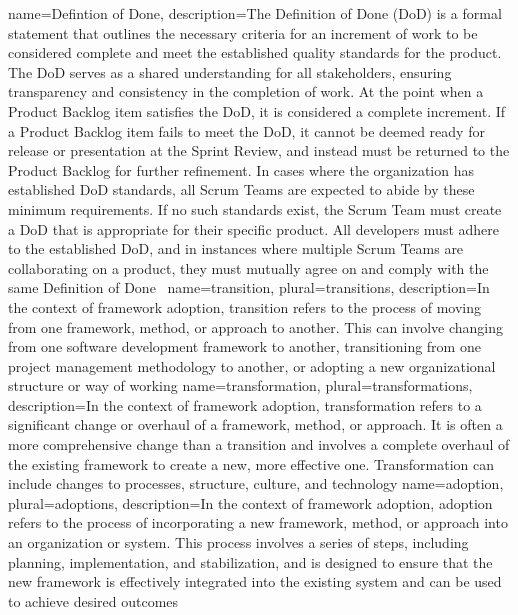 {
    name={Defintion of Done},
    description={The Definition of Done (DoD) is a formal statement that outlines the necessary criteria for an increment of work to be considered complete and meet the established quality standards for the product. The DoD serves as a shared understanding for all stakeholders, ensuring transparency and consistency in the completion of work.
        At the point when a Product Backlog item satisfies the DoD, it is considered a complete increment. If a Product Backlog item fails to meet the DoD, it cannot be deemed ready for release or presentation at the Sprint Review, and instead must be returned to the Product Backlog for further refinement.
        In cases where the organization has established DoD standards, all Scrum Teams are expected to abide by these minimum requirements. If no such standards exist, the Scrum Team must create a DoD that is appropriate for their specific product.
        All developers must adhere to the established DoD, and in instances where multiple Scrum Teams are collaborating on a product, they must mutually agree on and comply with the same Definition of Done~\cite{Huether2017TDo}}
}
{
    name={transition},
    plural={transitions},
    description={In the context of framework adoption, transition refers to the process of moving from one framework, method, or approach to another. This can involve changing from one software development framework to another, transitioning from one project management methodology to another, or adopting a new organizational structure or way of working}
}
{
    name={transformation},
    plural={transformations},
    description={In the context of framework adoption, transformation refers to a significant change or overhaul of a framework, method, or approach. It is often a more comprehensive change than a transition and involves a complete overhaul of the existing framework to create a new, more effective one. Transformation can include changes to processes, structure, culture, and technology}
}
{
    name={adoption},
    plural={adoptions},
    description={In the context of framework adoption, adoption refers to the process of incorporating a new framework, method, or approach into an organization or system. This process involves a series of steps, including planning, implementation, and stabilization, and is designed to ensure that the new framework is effectively integrated into the existing system and can be used to achieve desired outcomes}
}
